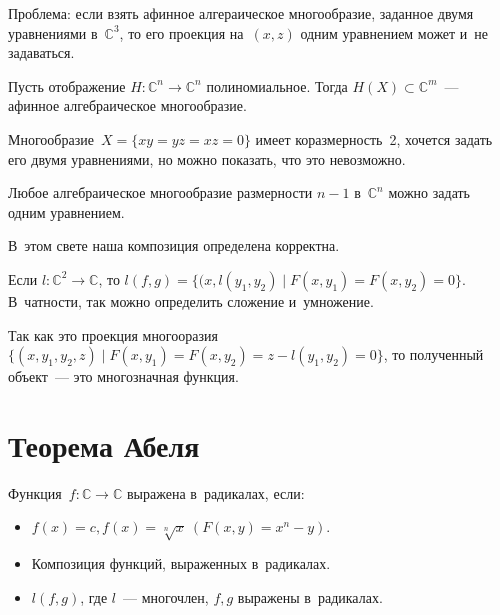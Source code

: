 \documentclass{article}
\begin{document}
Проблема: если взять афинное алгераическое многообразие, заданное двумя
уравнениями в~$\mathbb{C}^3$, то его проекция на~$(x, z)$ одним уравнением может
и~не задаваться.

\begin{theorem}
	Пусть отображение $H: \mathbb{C}^n \rightarrow \mathbb{C}^n$ полиномиальное.
	Тогда $H(X) \subset \mathbb{C}^m$~--- афинное алгебраическое многообразие.
\end{theorem}

\begin{example}
	Многообразие~$X = \{ xy = yz = xz = 0 \}$ имеет коразмерность~2, хочется
	задать его двумя уравнениями, но можно показать, что это невозможно.
\end{example}

\begin{theorem}
	Любое алгебраическое многообразие размерности $n - 1$ в~$\mathbb{C}^n$ можно
	задать одним уравнением.
\end{theorem}

В~этом свете наша композиция определена корректна.

\begin{definition}
	Если $l: \mathbb{C}^2 \rightarrow \mathbb{C}$, то $l(f, g) =
	\{ (x, l(y_1, y_2) \mid F(x, y_1) = F(x, y_2) = 0 \}$. В~чатности, так можно
	определить сложение и~умножение.

	Так как это проекция многооразия $\{ (x, y_1, y_2, z) \mid F(x, y_1) = F(x,
	y_2) = z - l(y_1, y_2) = 0\}$, то полученный объект~--- это многозначная
	функция.
\end{definition}

\section{Теорема Абеля}

\begin{definition}
	Функция~$f: \mathbb{C} \rightarrow \mathbb{C}$ выражена в~радикалах, если:
	\begin{itemize}
		\item $f(x) = c, f(x) = \sqrt[n]{x}\ (F(x, y) = x^n - y)$.
		\item Композиция функций, выраженных в~радикалах.
		\item $l(f, g)$, где $l$~--- многочлен, $f, g$ выражены в~радикалах.
	\end{itemize}
\end{definition}
\end{document}
